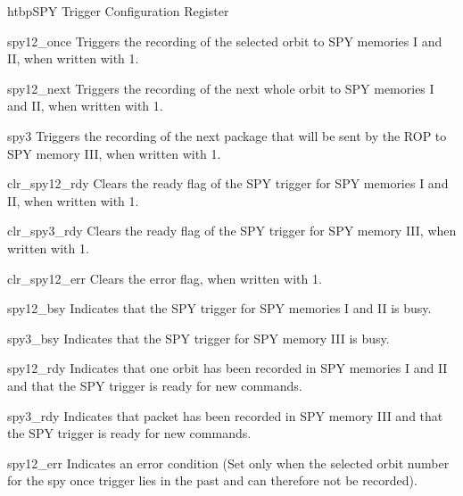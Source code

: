 \begin{register}{htbp}{SPY Trigger Configuration Register}{}%
	\label{spy_trig_cfg_reg}%
	\regnewline%

	\begin{regdesc}
	\begin{reglist}
		\item [spy12\_once] Triggers the recording of the selected orbit to SPY memories I and II, when written with 1.
		\item [spy12\_next] Triggers the recording of the next whole orbit to SPY memories I and II, when written with 1.
		\item [spy3] Triggers the recording of the next package that will be sent by the ROP to SPY memory III, when written with 1.
		\item [clr\_spy12\_rdy] Clears the ready flag of the SPY trigger for SPY memories I and II, when written with 1.
		\item [clr\_spy3\_rdy] Clears the ready flag of the SPY trigger for SPY memory III, when written with 1.
		\item [clr\_spy12\_err] Clears the error flag, when written with 1. 
		\item [spy12\_bsy] Indicates that the SPY trigger for SPY memories I and II is busy.
		\item [spy3\_bsy] Indicates that the SPY trigger for SPY memory III is busy.
		\item [spy12\_rdy] Indicates that one orbit has been recorded in SPY memories I and II and that the SPY trigger is ready for new commands.  
		\item [spy3\_rdy] Indicates that packet has been recorded in SPY memory III and that the SPY trigger is ready for new commands. 
		\item [spy12\_err] Indicates an error condition (Set only when the selected orbit number for the spy once trigger lies in the past and can therefore not be recorded).
	\end{reglist}
	\end{regdesc}
\end{register}

